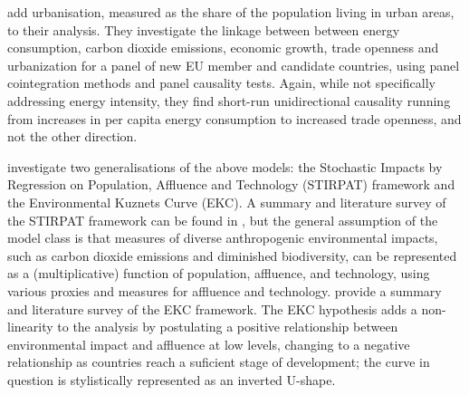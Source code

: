 \documentclass[12pt,a4paper]{article}
\begin{document}
\cite{kasmanCO2EmissionsEconomic2015} add urbanisation, measured as the share of the population living in urban areas, to their analysis.
They investigate the linkage between between energy consumption, carbon dioxide emissions, economic growth, trade openness and urbanization for a panel of new EU member and candidate countries, using panel cointegration methods and panel causality tests.
Again, while not specifically addressing energy intensity, they find short-run unidirectional
causality running from increases in per capita energy consumption to increased trade openness, and not the other direction.

\cite{rafiqUrbanizationOpennessEmissions2016} investigate two generalisations of the above models: the Stochastic Impacts by Regression on Population, Affluence and Technology (STIRPAT) framework and the Environmental Kuznets Curve (EKC).
A summary and literature survey of the STIRPAT framework can be found in \cite{mcgeeImpactsTechnologyReevaluation2015}, but the general assumption of the model class is that measures of diverse anthropogenic environmental impacts, such as carbon dioxide emissions and diminished biodiversity, can be represented as a (multiplicative) function of population, affluence, and technology, using various proxies and measures for affluence and technology.
\cite{dindaEnvironmentalKuznetsCurve2004} provide a summary and literature survey of the EKC framework. 
The EKC hypothesis adds a non-linearity to the analysis by postulating a positive relationship between environmental impact and affluence at low levels, changing to a negative relationship as countries reach a suficient stage of development; the curve in question is stylistically represented as an inverted U-shape.
\end{document}
